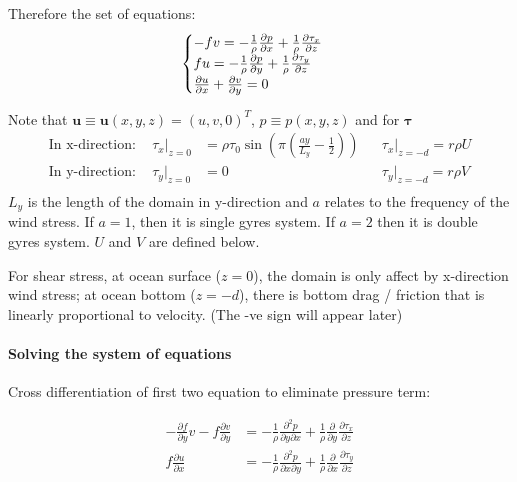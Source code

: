 \documentclass[11pt]{article}
\begin{document}
Therefore the set of equations: \begin{align*}
    \begin{cases}
      \large-fv = - \frac{1}{\rho} \frac{\partial p}{\partial x} + \frac{1}{\rho} \frac{\partial \tau_x}{\partial z} \\
      \large fu = - \frac{1}{\rho} \frac{\partial p}{\partial y} + \frac{1}{\rho} \frac{\partial \tau_y}{\partial z}\\
      \large \frac{\partial u}{\partial x} +  \frac{\partial v}{\partial y} = 0
    \end{cases}
\end{align*}

Note that
\(\mathbf{u} \equiv \mathbf{u}(x,y,z) = \left( u,v,0 \right)^T\),
\(p \equiv p(x,y,z)\) and for \(\mathbf{\tau}\) \begin{align*}
\text{In x-direction: }\,\,\,\,\, \tau_x\biggr|_{z=0} &= \rho \tau_0 \sin{\left( \pi \left( \frac{a y}{L_y} - \frac{1}{2} \right) \right)} && \tau_x\biggr|_{z=-d} = r \rho U \\
\text{In y-direction: }\,\,\,\,\, \tau_y\biggr|_{z=0} &= 0 && \tau_y\biggr|_{z=-d} = r \rho V \\
\end{align*} \(L_y\) is the length of the domain in y-direction and
\(a\) relates to the frequency of the wind stress. If \(a = 1\), then it
is single gyres system. If \(a=2\) then it is double gyres system. \(U\)
and \(V\) are defined below.

For shear stress, at ocean surface (\(z=0\)), the domain is only affect
by x-direction wind stress; at ocean bottom (\(z=-d\)), there is bottom
drag / friction that is linearly proportional to velocity. (The -ve sign
will appear later)

    \hypertarget{solving-the-system-of-equations}{%
\paragraph{Solving the system of
equations}\label{solving-the-system-of-equations}}

Cross differentiation of first two equation to eliminate pressure term:

\begin{align*}
-\frac{\partial f}{\partial y}v - f \frac{\partial v}{\partial y} &= - \frac{1}{\rho} \frac{\partial^2 p}{\partial y \partial x} + \frac{1}{\rho} \frac{\partial}{\partial y} \frac{\partial \tau_x}{\partial z}  \\
f \frac{\partial u}{\partial x} &= - \frac{1}{\rho} \frac{\partial^2 p}{\partial x \partial y} + \frac{1}{\rho} \frac{\partial}{\partial x} \frac{\partial \tau_y}{\partial z}\\
\end{align*}
\end{document}
